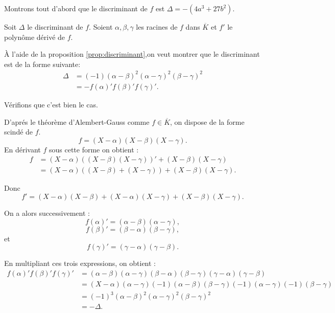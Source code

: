 \begin{demonstration}[Lemme]
    Montrons tout d'abord que le discriminant de $f$ est $\Delta= -(4a^3 + 27b^2)$.

    Soit $\Delta$ le discriminant de $f$. Soient $\alpha, \beta, \gamma $ les racines de $f$ dans $\overline{K}$ et $f'$ le polynôme dérivé de $f$.

    À l'aide de la proposition \ref{prop:discriminant},on veut montrer que le discriminant est de la forme
    suivante: 
    \begin{align*}
        \Delta &= (-1) ( \alpha - \beta )^2 ( \alpha - \gamma )^2 ( \beta - \gamma )^2 \\
          &= - f(\alpha)'f(\beta )'f(\gamma)'
    .\end{align*}

    Vérifions que c'est bien le cas.

    D'aprés le théorème d'Alembert-Gauss comme $f \in \overline{K}$, on dispose de la
    forme scindé de $f$.
    \[
        f = \left( X - \alpha \right) \left( X - \beta \right) \left( X - \gamma \right) 
    .\] 
    En dérivant $f$ sous cette forme on obtient :
    \begin{align*}
        f &= ( X - \alpha ) \left( ( X - \beta ) ( X - \gamma ) \right)'  + ( X - \beta ) ( X - \gamma )\\
          &= ( X - \alpha ) \left( ( X - \beta ) + ( X - \gamma ) \right) + ( X - \beta ) ( X - \gamma ) 
    .\end{align*}

    Donc  
\[
f' = ( X - \alpha ) ( X - \beta ) + ( X - \alpha ) ( X - \gamma ) + ( X - \beta ) ( X - \gamma )
.\] 

On a alors successivement : 
\[
    f(\alpha)' = ( \alpha - \beta) ( \alpha - \gamma )
,\] 
\[
f(\beta )' = ( \beta - \alpha) ( \beta - \gamma)
,\] 
et
\[
f(\gamma)' = ( \gamma - \alpha) ( \gamma - \beta)
.\] 

En multipliant ces trois expressions, on obtient :
\begin{align*}
    f(\alpha)' f(\beta )' f(\gamma)' &= ( \alpha - \beta ) ( \alpha - \gamma ) ( \beta - \alpha ) ( \beta - \gamma) ( \gamma - \alpha ) ( \gamma - \beta ) \\
&= \left( X - \alpha \right) \left( \alpha - \gamma \right) \left( -1 \right) \left( \alpha - \beta  \right) \left( \beta - \gamma \right) \left( -1 \right) \left( \alpha - \gamma \right) \left( -1 \right) \left( \beta - \gamma \right) \\
&= \left( -1 \right) ^3 \left( \alpha - \beta  \right) ^2 \left( \alpha - \gamma  \right) ^2 \left( \beta - \gamma \right) ^2\\
 &= - \Delta
.\end{align*}


\end{demonstration}
